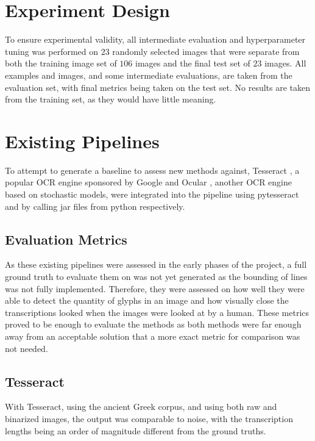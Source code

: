 \section{Experiment Design}

To ensure experimental validity, all intermediate evaluation and hyperparameter tuning was performed on $23$ randomly selected images that were separate from both the training image set of $106$ images and the final test set of $23$ images. All examples and images, and some intermediate evaluations, are taken from the evaluation set, with final metrics being taken on the test set. No results are taken from the training set, as they would have little meaning.

\section{Existing Pipelines}

To attempt to generate a baseline to assess new methods against, Tesseract \cite{SmithTesseract}, a popular OCR engine sponsored by Google \cite{Vincent} and Ocular \cite{Berg-Kirkpatrick}, another OCR engine based on stochastic models, were integrated into the pipeline using pytesseract \cite{Lee} and by calling jar files from python respectively.

\subsection{Evaluation Metrics}

As these existing pipelines were assessed in the early phases of the project, a full ground truth to evaluate them on was not yet generated as the bounding of lines was not fully implemented. Therefore, they were assessed on how well they were able to detect the quantity of glyphs in an image and how visually close the transcriptions looked when the images were looked at by a human. These metrics proved to be enough to evaluate the methods as both methods were far enough away from an acceptable solution that a more exact metric for comparison was not needed.

\subsection{Tesseract}

With Tesseract, using the ancient Greek corpus, and using both raw and binarized images, the output was comparable to noise, with the transcription lengths being an order of magnitude different from the ground truths.

